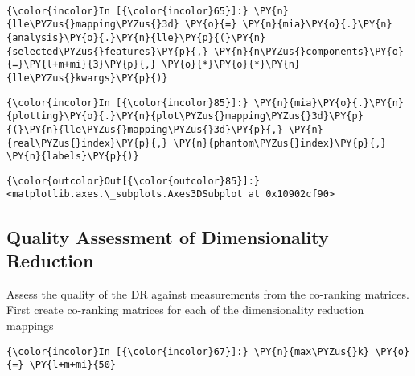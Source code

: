     \begin{center}
    \end{center}
    { \hspace*{\fill} \\}

    \begin{Verbatim}[commandchars=\\\{\}]
{\color{incolor}In [{\color{incolor}65}]:} \PY{n}{lle\PYZus{}mapping\PYZus{}3d} \PY{o}{=} \PY{n}{mia}\PY{o}{.}\PY{n}{analysis}\PY{o}{.}\PY{n}{lle}\PY{p}{(}\PY{n}{selected\PYZus{}features}\PY{p}{,} \PY{n}{n\PYZus{}components}\PY{o}{=}\PY{l+m+mi}{3}\PY{p}{,} \PY{o}{*}\PY{o}{*}\PY{n}{lle\PYZus{}kwargs}\PY{p}{)}
\end{Verbatim}

    \begin{Verbatim}[commandchars=\\\{\}]
{\color{incolor}In [{\color{incolor}85}]:} \PY{n}{mia}\PY{o}{.}\PY{n}{plotting}\PY{o}{.}\PY{n}{plot\PYZus{}mapping\PYZus{}3d}\PY{p}{(}\PY{n}{lle\PYZus{}mapping\PYZus{}3d}\PY{p}{,} \PY{n}{real\PYZus{}index}\PY{p}{,} \PY{n}{phantom\PYZus{}index}\PY{p}{,} \PY{n}{labels}\PY{p}{)}
\end{Verbatim}

            \begin{Verbatim}[commandchars=\\\{\}]
{\color{outcolor}Out[{\color{outcolor}85}]:} <matplotlib.axes.\_subplots.Axes3DSubplot at 0x10902cf90>
\end{Verbatim}

    \subsection{Quality Assessment of Dimensionality
Reduction}\label{quality-assessment-of-dimensionality-reduction}

    Assess the quality of the DR against measurements from the co-ranking
matrices. First create co-ranking matrices for each of the
dimensionality reduction mappings

    \begin{Verbatim}[commandchars=\\\{\}]
{\color{incolor}In [{\color{incolor}67}]:} \PY{n}{max\PYZus{}k} \PY{o}{=} \PY{l+m+mi}{50}
\end{Verbatim}

